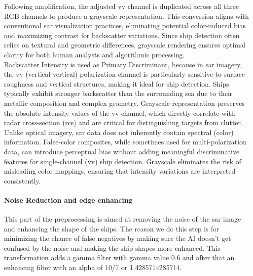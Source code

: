 \documentclass{article}
\begin{document}
Following amplification, the adjusted \acrshort{vv} channel is duplicated across all three RGB channels to produce a grayscale representation. This conversion aligns with conventional \acrshort{sar} visualization practices, eliminating potential color-induced bias and maximizing contrast for backscatter variations. Since ship detection often relies on textural and geometric differences, grayscale rendering ensures optimal clarity for both human analysts and algorithmic processing.\\

Backscatter Intensity is used as Primary Discriminant, because in \acrshort{sar} imagery, the \acrshort{vv} (vertical-vertical) polarization channel is particularly sensitive to surface roughness and vertical structures, making it ideal for ship detection. Ships typically exhibit stronger backscatter than the surrounding sea due to their metallic composition and complex geometry. Grayscale representation preserves the absolute intensity values of the \acrshort{vv} channel, which directly correlate with radar cross-section (\acrshort{rcs}) and are critical for distinguishing targets from clutter.\\

Unlike optical imagery, \acrshort{sar} data does not inherently contain spectral (color) information. False-color composites, while sometimes used for multi-polarization data, can introduce perceptual bias without adding meaningful discriminative features for single-channel (\acrshort{vv}) ship detection. Grayscale eliminates the risk of misleading color mappings, ensuring that intensity variations are interpreted consistently.\\

\paragraph{Noise Reduction and edge enhancing}
This part of the preprocessing is aimed at removing the noise of the \acrshort{sar} image and enhancing the shape of the ships. The reason we do this step is for minimizing the chance of false negatives by making sure the AI doesn’t get confused by the noise and making the ship shapes more enhanced. This transformation adds a gamma filter with gamma value 0.6 and after that an enhancing filter with an alpha of 10/7 or 1.4285714285714.\\
\end{document}
